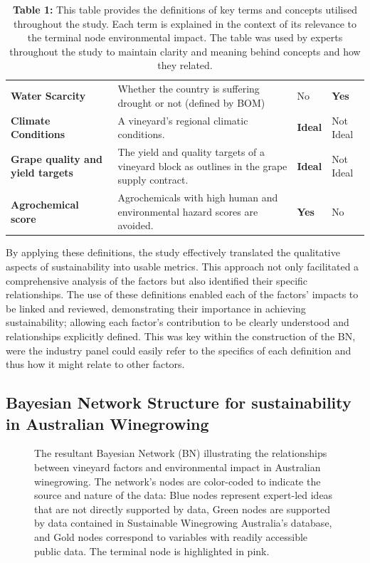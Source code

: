 \documentclass[fleqn,10pt]{wlscirep}
\begin{document}
\begin{table}[h]
\begin{tabular}{@{}llll@{}}
    \textbf{Water Scarcity} & Whether the country is suffering drought or not (defined by BOM) & No & \textbf{Yes} \\
    \textbf{Climate Conditions} & A vineyard's regional climatic conditions. & \textbf{Ideal} & Not Ideal \\
    \textbf{Grape quality and yield targets} & The yield and quality targets of a vineyard block as outlines in the grape supply contract. & \textbf{Ideal} & Not Ideal \\
    \textbf{Agrochemical score} & Agrochemicals with high human and environmental hazard scores are avoided. & \textbf{Yes} & No \\ \bottomrule
    \end{tabular}
    \caption{\textbf{Table 1:} This table provides the definitions of key terms and concepts utilised throughout the study. Each term is explained in the context of its relevance to the terminal node environmental impact. The table was used by experts throughout the study to maintain clarity and meaning behind concepts and how they related.}\label{tab:definitions}
\end{table}

By applying these definitions, the study effectively translated the qualitative aspects of sustainability into usable metrics. This approach not only facilitated a comprehensive analysis of the factors but also identified their specific relationships. The use of these definitions enabled each of the factors' impacts to be linked and reviewed, demonstrating their importance in achieving sustainability; allowing each factor's contribution to be clearly understood and relationships explicitly defined. This was key within the construction of the BN, were the industry panel could easily refer to the specifics of each definition and thus how it might relate to other factors.

\subsection*{Bayesian Network Structure for sustainability in Australian Winegrowing}

\begin{figure}[h!]
    \centering
    \caption{The resultant Bayesian Network (BN) illustrating the relationships between vineyard factors and environmental impact in Australian winegrowing. The network's nodes are color-coded to indicate the source and nature of the data: Blue nodes represent expert-led ideas that are not directly supported by data, Green nodes are supported by data contained in Sustainable Winegrowing Australia's database, and Gold nodes correspond to variables with readily accessible public data. The terminal node is highlighted in pink.}\label{fig:generalBN}
\end{figure}
\end{document}
